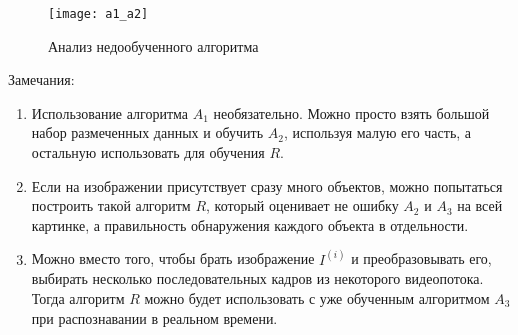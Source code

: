 \documentclass[a4paper,12pt]{article} %
\begin{document}
\begin{figure}[H]
    \centering \texttt{[image: a1\_a2]}
    \caption{ Анализ недообученного алгоритма }
    \label{fig:a1_a2}
\end{figure}

\smallskip

Замечания:
\begin{enumerate}
    \item Использование алгоритма $ A_1 $ необязательно. Можно просто взять большой набор размеченных данных и обучить $ A_2 $, используя малую его часть, а остальную использовать для обучения $ R $.
    \item Если на изображении присутствует сразу много объектов, можно попытаться построить такой алгоритм $ R $, который оценивает не ошибку $ A_2 $ и $ A_3 $ на всей картинке, а правильность обнаружения каждого объекта в отдельности.
    \item Можно вместо того, чтобы брать изображение $ I^{(i)} $ и преобразовывать его, выбирать несколько последовательных кадров из некоторого видеопотока. Тогда алгоритм $ R $ можно будет использовать с уже обученным алгоритмом $ A_3 $ при распознавании в реальном времени.
\end{enumerate}

\medskip
\printbibliography
\end{document}
